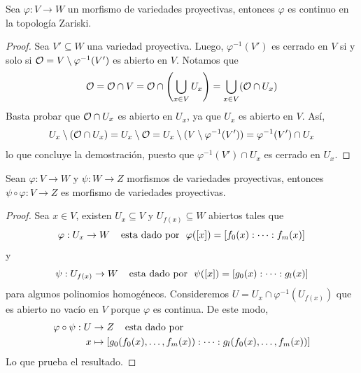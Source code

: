 \documentclass[11pt]{article}
\begin{document}
\begin{lema}
    Sea $\varphi:V\to W$ un morfismo de variedades proyectivas, entonces $\varphi$ es continuo
    en la topología Zariski.
\end{lema}

\begin{proof}
    Sea $V'\subseteq W$ una variedad proyectiva. Luego, $\varphi^{-1}(V')$ es cerrado en $V$ si y
    solo si $\mathcal{O}=V\setminus\varphi^{-1}(V')$ es abierto en $V$. Notamos que
    \begin{equation*}
        \mathcal{O}=\mathcal{O}\cap V=\mathcal{O}\cap\left(\bigcup_{x\in V}U_{x}\right)=\bigcup_{x\in V}(\mathcal{O}\cap U_{x})
    \end{equation*}
    Basta probar que $\mathcal{O}\cap U_{x}$ es abierto en $U_{x}$, ya que $U_{x}$ es abierto en $V$. Así,
    \begin{align*}
        U_{x}\setminus(\mathcal{O}\cap U_{x})=U_{x}\setminus\mathcal{O}=U_{x}\setminus(V\setminus \varphi^{-1}(V'))
        =\varphi^{-1}(V')\cap U_{x}
    \end{align*}
    lo que concluye la demostración, puesto que $\varphi^{-1}(V')\cap U_{x}$ es cerrado en 
    $U_{x}$.
\end{proof}

\begin{prop}
    Sean $\varphi:V\to W$ y $\psi:W\to Z$ morfismos de variedades proyectivas, entonces 
    $\psi\circ\varphi:V\to Z$ es morfismo de variedades proyectivas.
\end{prop}

\begin{proof}
    Sea $x\in V$, existen $U_{x}\subseteq V$ y $U_{f(x)}\subseteq W$ abiertos tales que
    \begin{equation*}
        \varphi:U_{x}\to W \htext{esta dado por } \varphi([x])=[f_{0}(x):\dots:f_{m}(x)]
    \end{equation*}
    y
    \begin{equation*}
        \psi:U_{f(x)}\to W \htext{esta dado por } \psi([x])=[g_{0}(x):\dots:g_{l}(x)]
    \end{equation*}
    para algunos polinomios homogéneos. Consideremos $U=U_{x}\cap\varphi^{-1}(U_{f(x)})$ que es
    abierto no vacío en $V$ porque $\varphi$ es continua. De este modo,
    \begin{align*}
        \varphi\circ\psi:U &\to Z \hspace{4mm}\text{esta dado por  } \\
        x &\mapsto [g_{0}(f_{0}(x),\dots,f_{m}(x)):\dots:g_{l}(f_{0}(x),\dots,f_{m}(x))]
    \end{align*}
    Lo que prueba el resultado.
\end{proof}
\end{document}
